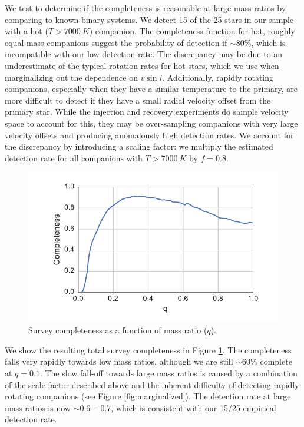\documentclass{emulateapj}
\begin{document}
We test to determine if the completeness is reasonable at large mass ratios by comparing to known binary systems. We detect 15 of the 25 stars in our sample with a hot ($T > 7000\ K$) companion. The completeness function for hot, roughly equal-mass companions suggest the probability of detection if $\sim 80\%$, which is incompatible with our low detection rate. The discrepancy may be due to an underestimate of the typical rotation rates for hot stars, which we use when marginalizing out the dependence on $v\sin{i}$. Additionally, rapidly rotating companions, especially when they have a similar temperature to the primary, are more difficult to detect if they have a small radial velocity offset from the primary star. While the injection and recovery experiments do sample velocity space to account for this, they may be over-sampling companions with very large velocity offsets and producing anomalously high detection rates. We account for the discrepancy by introducing a scaling factor: we multiply the estimated detection rate for all companions with $T > 7000\ K$ by $f=0.8$. 


\begin{figure}
\includegraphics[width=\columnwidth]{SurveyCompleteness.pdf}
\caption{Survey completeness as a function of mass ratio ($q$).}
\label{fig:completeness}
\end{figure}

We show the resulting total survey completeness in Figure \ref{fig:completeness}. The completeness falls very rapidly towards low mass ratios, although we are still $\sim 60\%$ complete at $q = 0.1$. The slow fall-off towards large mass ratios is caused by a combination of the scale factor described above and the inherent difficulty of detecting rapidly rotating companions (see Figure \ref{fig:marginalized}). The detection rate at large mass ratios is now $\sim 0.6-0.7$, which is consistent with our 15/25 empirical detection rate. 
\end{document}
